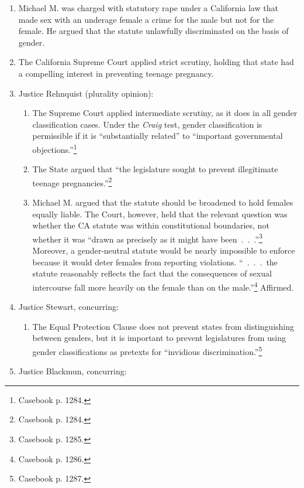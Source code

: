 \begin{enumerate}
    \item Michael M. was charged with statutory rape under a California law 
    that made sex with an underage female a crime for the male but not for the 
    female. He argued that the statute unlawfully discriminated on the basis 
    of gender.
    \item The California Supreme Court applied strict scrutiny, holding that 
    state had a compelling interest in preventing teenage pregnancy.
    \item Justice Rehnquist (plurality opinion):
    \begin{enumerate}
        \item The Supreme Court applied intermediate scrutiny, as it does in 
        all gender classification cases. Under the \emph{Craig} test, gender 
        classification is permissible if it is ``substantially related'' to 
        ``important governmental objections.''\footnote{Casebook p. 1284.}
        \item The State argued that ``the legislature sought to prevent 
        illegitimate teenage pregnancies.''\footnote{Casebook p. 1284.}
        \item Michael M. argued that the statute should be broadened to hold 
        females equally liable. The Court, however, held that the relevant 
        question was whether the CA statute was within constitutional 
        boundaries, not whether it was ``drawn as precisely as it might have 
        been~.~.~.''\footnote{Casebook p. 1285.} Moreover, a gender-neutral 
        statute would be nearly impossible to enforce because it would deter 
        females from reporting violations.
        ``~.~.~.~the statute reasonably reflects the fact that the 
        consequences of sexual intercourse fall more heavily on the female 
        than on the male.''\footnote{Casebook p. 1286.} Affirmed.
    \end{enumerate}
    \item Justice Stewart, concurring:
    \begin{enumerate}
        \item The Equal Protection Clause does not prevent states from 
        distinguishing between genders, but it is important to prevent 
        legislatures from using gender classifications as pretexts for 
        ``invidious discrimination.''\footnote{Casebook p. 1287.}
    \end{enumerate}
    \item Justice Blackmun, concurring:

\end{enumerate}
